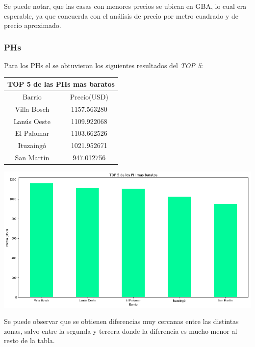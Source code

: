 \documentclass[a4paper, 10pt]{article}
\begin{document}
				Se puede notar, que las casas con menores precios se ubican en GBA, lo cual era esperable, ya que concuerda con el análisis de precio por metro cuadrado y de precio aproximado.
				
				\subsubsection{PHs}
				
					Para los PHs el se obtuvieron los siguientes resultados del \emph{TOP 5}:
				
					\begin{center}
						\begin{tabular}{ |c|c| }
							\hline
							\multicolumn{2}{|c|}{TOP 5 de las PHs mas baratos}\\
							\hline
							\hline
							Barrio & Precio(USD)\\
							\hline
							Villa Bosch & 1157.563280 \\
							Lanús Oeste & 1109.922068 \\
							El Palomar & 1103.662526 \\														
							Ituzaingó & 1021.952671 \\
							San Martín & 947.012756 \\

							\hline
						\end{tabular}
					\end{center}
				
				\begin{center}
   		    				\includegraphics[width=\textwidth]{images/topPHb}
				\end{center}
				
				Se puede observar que se obtienen diferencias muy cercanas entre las distintas zonas, salvo entre la segunda y tercera donde la diferencia es mucho menor al resto de la tabla.
				
\end{document}

